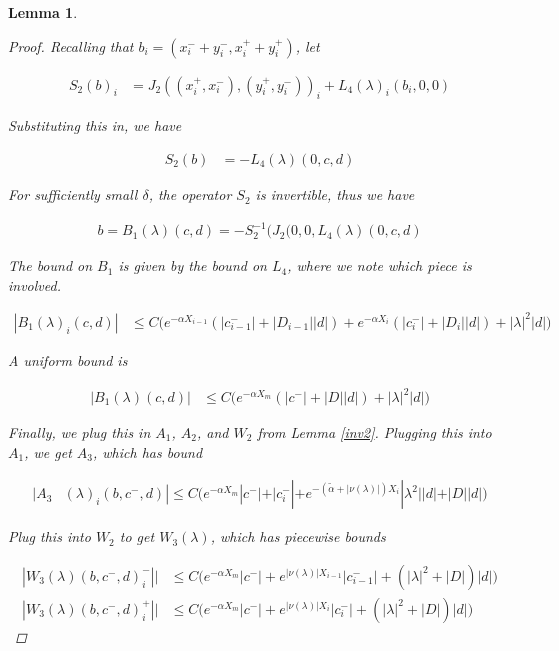 \documentclass[12pt]{article}
\newtheorem{lemma}{Lemma}
\begin{document}
\begin{lemma}
\begin{proof}
Recalling that $b_i = (x_i^- + y_i^-, x_i^+ + y_i^+)$, let

\begin{align*}
S_2(b)_i &= J_2( (x_i^+, x_i^-),(y_i^+, y_i^-))_i 
+ L_4(\lambda)_i(b_i, 0, 0) 
\end{align*}

Substituting this in, we have

\begin{align*}
S_2(b) &= -L_4(\lambda)(0, c, d)
\end{align*}

For sufficiently small $\delta$, the operator $S_2$ is invertible, thus we have

\begin{align}
b = B_1(\lambda)(c,d) 
= -S_2^{-1} ( J_2(0, 0,L_4(\lambda)(0, c, d)
\end{align}

The bound on $B_1$ is given by the bound on $L_4$, where we note which piece is involved.

\begin{align*}
|B_1(\lambda)_i(c, d)| &\leq C \Big( 
e^{-\alpha X_{i-1}}( |c_{i-1}^-| + |D_{i-1}||d| )
+ e^{-\alpha X_i}( |c_i^-| + |D_i||d| )
+ |\lambda|^2 |d| \Big)
\end{align*}

A uniform bound is

\begin{align*}
|B_1(\lambda)(c, d)| &\leq C \Big( 
e^{-\alpha X_m}( |c^-| + |D||d|) + |\lambda|^2 |d| \Big)
\end{align*}

Finally, we plug this in $A_1$, $A_2$, and $W_2$ from Lemma \ref{inv2}. Plugging this into $A_1$, we get $A_3$, which has bound

\begin{align*}
|A_3&(\lambda)_i(b, c^-, d)|
\leq C \Big( e^{-\alpha X_m} |c^-| + |c_i^-| + e^{-(\tilde{\alpha}+|\nu(\lambda)|) X_i} |\lambda^2| |d| + |D||d| \Big)
\end{align*} 

Plug this into $W_2$ to get $W_3(\lambda)$, which has piecewise bounds

\begin{align*}
|W_3(\lambda)(b,c^-,d)_i^-|| &\leq C \Big( e^{-\alpha X_m} |c^-| + e^{|\nu(\lambda)|X_{i-1}}|c_{i-1}^-| + (|\lambda|^2 + |D|)|d| \Big) \\
|W_3(\lambda)(b,c^-,d)_i^+|| 
&\leq C \Big( e^{-\alpha X_m} |c^-| + e^{|\nu(\lambda)|X_i}|c_i^-| + (|\lambda|^2 + |D|)|d| \Big)
\end{align*}


\end{proof}
\end{lemma}
\end{document}
